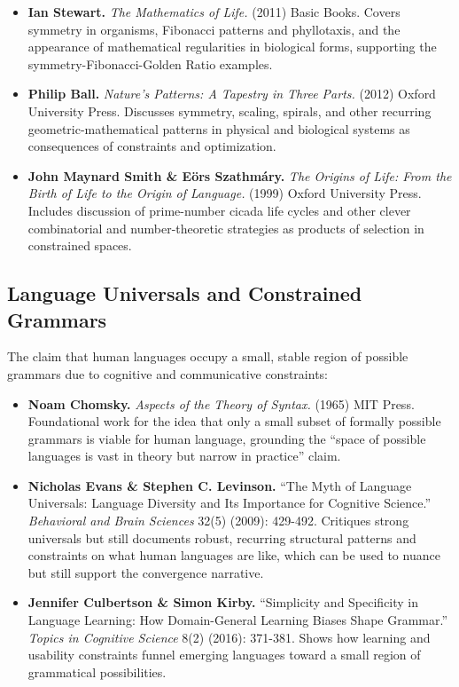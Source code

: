 \documentclass[
  openright]{book}
\begin{document}
\begin{itemize}
\item
  \textbf{Ian Stewart.} \emph{The Mathematics of Life.} (2011) Basic
  Books. Covers symmetry in organisms, Fibonacci patterns and
  phyllotaxis, and the appearance of mathematical regularities in
  biological forms, supporting the symmetry-Fibonacci-Golden Ratio
  examples.
\item
  \textbf{Philip Ball.} \emph{Nature's Patterns: A Tapestry in Three
  Parts.} (2012) Oxford University Press. Discusses symmetry, scaling,
  spirals, and other recurring geometric-mathematical patterns in
  physical and biological systems as consequences of constraints and
  optimization.
\item
  \textbf{John Maynard Smith \& Eörs Szathmáry.} \emph{The Origins of
  Life: From the Birth of Life to the Origin of Language.} (1999) Oxford
  University Press. Includes discussion of prime-number cicada life
  cycles and other clever combinatorial and number-theoretic strategies
  as products of selection in constrained spaces.
\end{itemize}

\subsection{Language Universals and Constrained
Grammars}\label{language-universals-and-constrained-grammars}

The claim that human languages occupy a small, stable region of possible
grammars due to cognitive and communicative constraints:

\begin{itemize}
\item
  \textbf{Noam Chomsky.} \emph{Aspects of the Theory of Syntax.} (1965)
  MIT Press. Foundational work for the idea that only a small subset of
  formally possible grammars is viable for human language, grounding the
  ``space of possible languages is vast in theory but narrow in
  practice'' claim.
\item
  \textbf{Nicholas Evans \& Stephen C. Levinson.} ``The Myth of Language
  Universals: Language Diversity and Its Importance for Cognitive
  Science.'' \emph{Behavioral and Brain Sciences} 32(5) (2009): 429-492.
  Critiques strong universals but still documents robust, recurring
  structural patterns and constraints on what human languages are like,
  which can be used to nuance but still support the convergence
  narrative.
\item
  \textbf{Jennifer Culbertson \& Simon Kirby.} ``Simplicity and
  Specificity in Language Learning: How Domain-General Learning Biases
  Shape Grammar.'' \emph{Topics in Cognitive Science} 8(2) (2016):
  371-381. Shows how learning and usability constraints funnel emerging
  languages toward a small region of grammatical possibilities.
\end{itemize}
\end{document}
